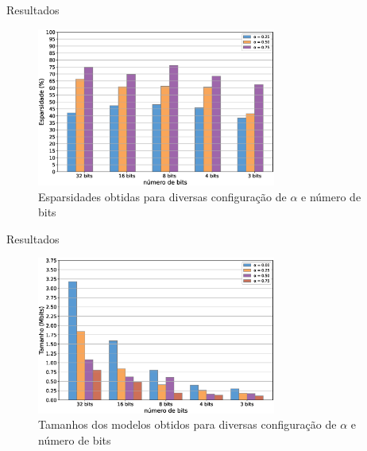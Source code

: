 \begin{frame}{Resultados}
    \begin{figure}[H]
    \centering
    \includegraphics[width=0.7\textwidth]{figuras/sparsity.eps}
    \caption{Esparsidades obtidas para diversas configuração de $\alpha$ e número de bits}
    \end{figure}
\end{frame}

\begin{frame}{Resultados}
    \begin{figure}[H]
    \centering
    \includegraphics[width=0.7\textwidth]{figuras/sizes.eps}
    \caption{Tamanhos dos modelos obtidos para diversas configuração de $\alpha$ e número de bits}
    \end{figure}
\end{frame}

